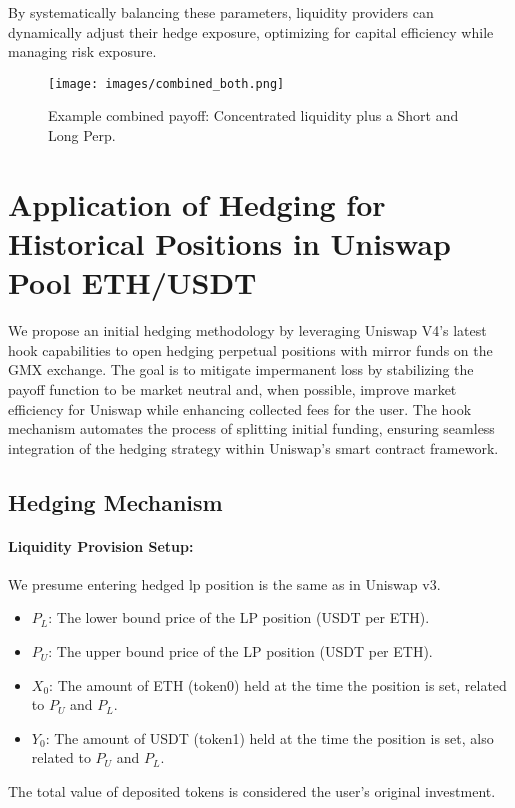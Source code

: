 \documentclass[12pt]{article}
\begin{document}
By systematically balancing these parameters, liquidity providers can dynamically adjust their hedge exposure, optimizing for capital efficiency while managing risk exposure.

\begin{figure}[htb]
    \centering
    \texttt{[image: images/combined\_both.png]}
    \caption{Example combined payoff: Concentrated liquidity plus a Short and Long Perp.}
    \label{fig:combined-short}
\end{figure}

\newpage

\section{Application of Hedging for Historical Positions in Uniswap Pool ETH/USDT}
\label{sec:hedgingmechanism}

We propose an initial hedging methodology by leveraging Uniswap V4's latest hook capabilities to open hedging perpetual positions with mirror funds on the GMX exchange. The goal is to mitigate impermanent loss by stabilizing the payoff function to be market neutral and, when possible, improve market efficiency for Uniswap while enhancing collected fees for the user. The hook mechanism automates the process of splitting initial funding, ensuring seamless integration of the hedging strategy within Uniswap’s smart contract framework.

\subsection{Hedging Mechanism}

\paragraph{Liquidity Provision Setup:} 
We presume entering hedged lp position is the same as in Uniswap v3.
\begin{itemize}
	\item $P_L$: The lower bound price of the LP position (USDT per ETH).
	\item $P_U$: The upper bound price of the LP position (USDT per ETH).
	\item $X_0$: The amount of ETH (token0) held at the time the position is set, related to $P_U$ and $P_L$.
	\item $Y_0$: The amount of USDT (token1) held at the time the position is set, also related to $P_U$ and $P_L$.
\end{itemize}
The total value of deposited tokens is considered the user's original investment.
\end{document}
